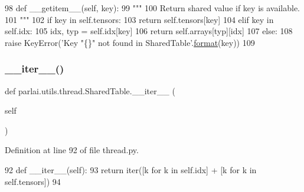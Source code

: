 \begin{DoxyCode}
98     \textcolor{keyword}{def }\_\_getitem\_\_(self, key):
99         \textcolor{stringliteral}{"""}
100 \textcolor{stringliteral}{        Return shared value if key is available.}
101 \textcolor{stringliteral}{        """}
102         \textcolor{keywordflow}{if} key \textcolor{keywordflow}{in} self.tensors:
103             \textcolor{keywordflow}{return} self.tensors[key]
104         \textcolor{keywordflow}{elif} key \textcolor{keywordflow}{in} self.idx:
105             idx, typ = self.idx[key]
106             \textcolor{keywordflow}{return} self.arrays[typ][idx]
107         \textcolor{keywordflow}{else}:
108             \textcolor{keywordflow}{raise} KeyError(\textcolor{stringliteral}{'Key "\{\}" not found in SharedTable'}.\hyperlink{namespaceparlai_1_1chat__service_1_1services_1_1messenger_1_1shared__utils_a32e2e2022b824fbaf80c747160b52a76}{format}(key))
109 
\end{DoxyCode}
\mbox{\label{classparlai_1_1utils_1_1thread_1_1SharedTable_a6c386b5fba3bd7ff0715c808decbaa54}} 
\subsubsection{\texorpdfstring{\+\_\+\+\_\+iter\+\_\+\+\_\+()}{\_\_iter\_\_()}}
{\footnotesize\ttfamily def parlai.\+utils.\+thread.\+Shared\+Table.\+\_\+\+\_\+iter\+\_\+\+\_\+ (\begin{DoxyParamCaption}\item[{}]{self }\end{DoxyParamCaption})}



Definition at line 92 of file thread.\+py.


\begin{DoxyCode}
92     \textcolor{keyword}{def }\_\_iter\_\_(self):
93         \textcolor{keywordflow}{return} iter([k \textcolor{keywordflow}{for} k \textcolor{keywordflow}{in} self.idx] + [k \textcolor{keywordflow}{for} k \textcolor{keywordflow}{in} self.tensors])
94 
\end{DoxyCode}
\mbox{\label{classparlai_1_1utils_1_1thread_1_1SharedTable_a6b6c4f7fb5887de4e2c82b0c11b6d680}} 
